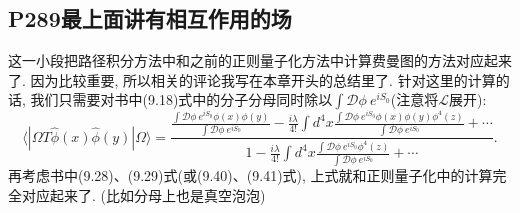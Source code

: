 \subsection{P289最上面讲有相互作用的场}
这一小段把路径积分方法中和之前的正则量子化方法中计算费曼图的方法对应起来了. 因为比较重要, 所以相关的评论我写在本章开头的总结里了. 针对这里的计算的话, 我们只需要对书中(9.18)式中的分子分母同时除以$\int \mathcal{D}\phi\ e^{iS_0}$(注意将$\mathcal{L}$展开):
\begin{equation}
  \langle | \Omega T \hat{\phi}(x) \hat{\phi}(y) | \Omega \rangle = \frac{\frac{\int \mathcal{D}\phi\ e^{iS_0} \phi(x)\phi(y)}{\int \mathcal{D}\phi\ e^{iS_0}} - \frac{i\lambda}{4!}\int d^4x \frac{\int \mathcal{D}\phi\ e^{iS_0} \phi(x)\phi(y)\phi^4(z)}{\int \mathcal{D}\phi\ e^{iS_0}}+\cdots}{1 - \frac{i\lambda}{4!}\int d^4x \frac{\int \mathcal{D}\phi\ e^{iS_0} \phi^4(z)}{\int \mathcal{D}\phi\ e^{iS_0}}+\cdots}.
\end{equation}
再考虑书中(9.28)、(9.29)式(或(9.40)、(9.41)式), 上式就和正则量子化中的计算完全对应起来了. (比如分母上也是真空泡泡)


